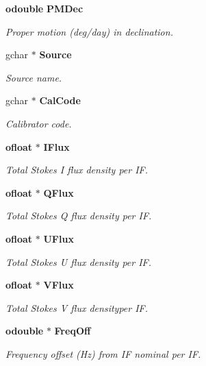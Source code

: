 \begin{CompactItemize}
{\bf odouble} {\bf PMDec}
\begin{CompactList}\small\item\em Proper motion (deg/day) in declination. \item\end{CompactList}\item 
gchar $\ast$ {\bf Source}
\begin{CompactList}\small\item\em Source name. \item\end{CompactList}\item 
gchar $\ast$ {\bf Cal\-Code}
\begin{CompactList}\small\item\em Calibrator code. \item\end{CompactList}\item 
{\bf ofloat} $\ast$ {\bf IFlux}
\begin{CompactList}\small\item\em Total Stokes I flux density per IF. \item\end{CompactList}\item 
{\bf ofloat} $\ast$ {\bf QFlux}
\begin{CompactList}\small\item\em Total Stokes Q flux density per IF. \item\end{CompactList}\item 
{\bf ofloat} $\ast$ {\bf UFlux}
\begin{CompactList}\small\item\em Total Stokes U flux density per IF. \item\end{CompactList}\item 
{\bf ofloat} $\ast$ {\bf VFlux}
\begin{CompactList}\small\item\em Total Stokes V flux densityper IF. \item\end{CompactList}\item 
{\bf odouble} $\ast$ {\bf Freq\-Off}
\begin{CompactList}\small\item\em Frequency offset (Hz) from IF nominal per IF. \item\end{CompactList}\item 

\end{CompactItemize}
